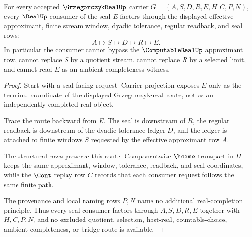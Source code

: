 \begin{theorem}
\label{thm:grzegorczyk-real-stream-real-seal-factorization}
For every accepted $\GrzegorczykRealUp$ carrier $G=(A,S,D,R,E,H,C,P,N)$, every $\RealUp$ consumer of the seal $E$ factors through the displayed effective approximant, finite stream window, dyadic tolerance, regular readback, and seal rows:
$$
A\longmapsto S\longmapsto D\longmapsto R\longmapsto E .
$$
In particular the consumer cannot bypass the $\ComputableRealUp$ approximant row, cannot replace $S$ by a quotient stream, cannot replace $R$ by a selected limit, and cannot read $E$ as an ambient completeness witness.
\end{theorem}
\begin{proof}
Start with a seal-facing request. Carrier projection exposes $E$ only as the terminal coordinate of the displayed Grzegorczyk-real route, not as an independently completed real object.

Trace the route backward from $E$. The seal is downstream of $R$, the regular readback is downstream of the dyadic tolerance ledger $D$, and the ledger is attached to finite windows $S$ requested by the effective approximant row $A$.

The structural rows preserve this route. Componentwise $\hsame$ transport in $H$ keeps the same approximant, window, tolerance, readback, and seal coordinates, while the $\Cont$ replay row $C$ records that each consumer request follows the same finite path.

The provenance and local naming rows $P,N$ name no additional real-completion principle. Thus every seal consumer factors through $A,S,D,R,E$ together with $H,C,P,N$, and no excluded quotient, selection, host-real, countable-choice, ambient-completeness, or bridge route is available.
\end{proof}

